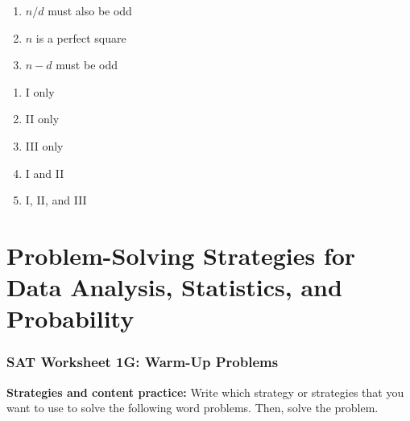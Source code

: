 \documentclass[12pt]{book}
\begin{document}
\begin{multienumerate}
{\begin{enumerate}[label=\Roman*.]
\item $n/d$ must also be odd
\item $n$ is a perfect square
\item $n-d$ must be odd
\end{enumerate}

\begin{enumerate}[label=(\Alph*)]
\item I only
\item II only
\item III only
\item I and II
\item I, II, and III
\end{enumerate}}
\end{multienumerate}

\chapter[Statistics, and Probability]{Problem-Solving Strategies for Data Analysis, Statistics, and Probability}

\subsection{SAT Worksheet 1G: Warm-Up Problems}

\textbf{Strategies and content practice:} Write which strategy or strategies that you want to use to solve the following word problems. Then, solve the problem.
\end{document}
